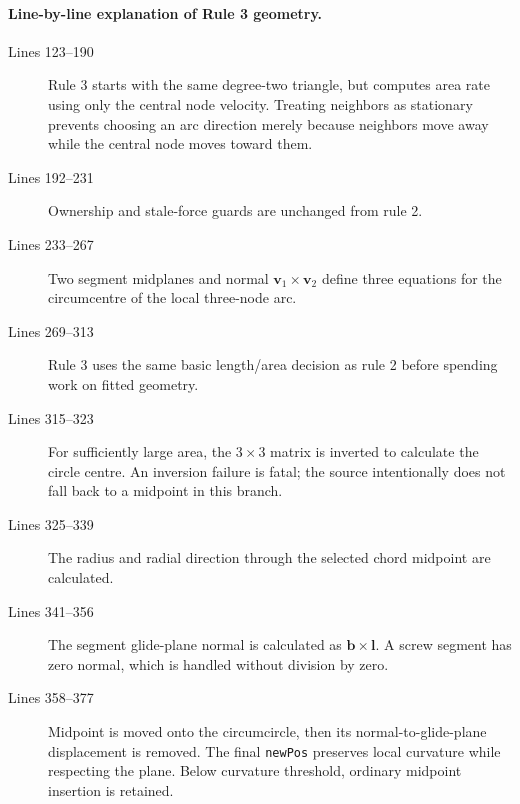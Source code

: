 \documentclass[11pt]{article}
\newcommand{\code}[1]{\texorpdfstring{\nolinkurl{#1}}{#1}}
\newcommand{\vect}[1]{\bm{#1}}
\begin{document}
\paragraph{Line-by-line explanation of Rule 3 geometry.}
\begin{description}
\item[Lines 123--190] Rule 3 starts with the same degree-two triangle, but
computes area rate using only the central node velocity. Treating neighbors as
stationary prevents choosing an arc direction merely because neighbors move
away while the central node moves toward them.
\item[Lines 192--231] Ownership and stale-force guards are unchanged from
rule 2.
\item[Lines 233--267] Two segment midplanes and normal
\(\vect{v}_1\times\vect{v}_2\) define three equations for the circumcentre of
the local three-node arc.
\item[Lines 269--313] Rule 3 uses the same basic length/area decision as rule
2 before spending work on fitted geometry.
\item[Lines 315--323] For sufficiently large area, the \(3\times3\) matrix is
inverted to calculate the circle centre. An inversion failure is fatal; the
source intentionally does not fall back to a midpoint in this branch.
\item[Lines 325--339] The radius and radial direction through the selected
chord midpoint are calculated.
\item[Lines 341--356] The segment glide-plane normal is calculated as
\(\vect{b}\times\vect{l}\). A screw segment has zero normal, which is handled
without division by zero.
\item[Lines 358--377] Midpoint is moved onto the circumcircle, then its
normal-to-glide-plane displacement is removed. The final \code{newPos}
preserves local curvature while respecting the plane. Below curvature
threshold, ordinary midpoint insertion is retained.
\end{description}




\end{document}
